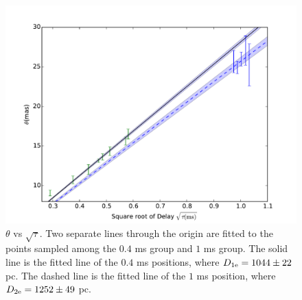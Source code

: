 \documentclass[useAMS,usenatbib]{mn2e}
\begin{document}
\begin{figure}
\centering
\includegraphics[width=1.0\linewidth, angle=0]{Theta_tau.pdf}
\caption{${\theta}$ vs ${\sqrt{\tau}}$.  Two separate lines through the
  origin are fitted to the points sampled among the $0.4$ ms group
  and $1$ ms group.  The solid line is the fitted line of the $0.4$ ms
  positions, where $D_{1\rm e}=1044\pm 22$ pc. The dashed line is
  the fitted line of the $1$ ms 
  position, where $D_{2\rm e}=1252\pm 49$ pc.
}
\label{thetatau}
\end{figure}
\end{document}
